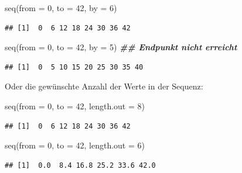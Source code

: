 \documentclass[
]{book}
\newenvironment{Shaded}{\begin{snugshade}}{\end{snugshade}}
\newcommand{\AttributeTok}[1]{\textcolor[rgb]{0.77,0.63,0.00}{#1}}
\newcommand{\DecValTok}[1]{\textcolor[rgb]{0.00,0.00,0.81}{#1}}
\newcommand{\DocumentationTok}[1]{\textcolor[rgb]{0.56,0.35,0.01}{\textbf{\textit{#1}}}}
\newcommand{\FunctionTok}[1]{\textcolor[rgb]{0.00,0.00,0.00}{#1}}
\newcommand{\NormalTok}[1]{#1}
\begin{document}
\begin{Shaded}
\begin{Highlighting}[]
\FunctionTok{seq}\NormalTok{(}\AttributeTok{from =} \DecValTok{0}\NormalTok{, }\AttributeTok{to =} \DecValTok{42}\NormalTok{, }\AttributeTok{by =} \DecValTok{6}\NormalTok{)}
\end{Highlighting}
\end{Shaded}

\begin{verbatim}
## [1]  0  6 12 18 24 30 36 42
\end{verbatim}

\begin{Shaded}
\begin{Highlighting}[]
\FunctionTok{seq}\NormalTok{(}\AttributeTok{from =} \DecValTok{0}\NormalTok{, }\AttributeTok{to =} \DecValTok{42}\NormalTok{, }\AttributeTok{by =} \DecValTok{5}\NormalTok{) }\DocumentationTok{\#\# Endpunkt nicht erreicht }
\end{Highlighting}
\end{Shaded}

\begin{verbatim}
## [1]  0  5 10 15 20 25 30 35 40
\end{verbatim}

Oder die gewünschte Anzahl der Werte in der Sequenz:

\begin{Shaded}
\begin{Highlighting}[]
\FunctionTok{seq}\NormalTok{(}\AttributeTok{from =} \DecValTok{0}\NormalTok{, }\AttributeTok{to =} \DecValTok{42}\NormalTok{, }\AttributeTok{length.out =} \DecValTok{8}\NormalTok{)}
\end{Highlighting}
\end{Shaded}

\begin{verbatim}
## [1]  0  6 12 18 24 30 36 42
\end{verbatim}

\begin{Shaded}
\begin{Highlighting}[]
\FunctionTok{seq}\NormalTok{(}\AttributeTok{from =} \DecValTok{0}\NormalTok{, }\AttributeTok{to =} \DecValTok{42}\NormalTok{, }\AttributeTok{length.out =} \DecValTok{6}\NormalTok{)}
\end{Highlighting}
\end{Shaded}

\begin{verbatim}
## [1]  0.0  8.4 16.8 25.2 33.6 42.0
\end{verbatim}
\end{document}
